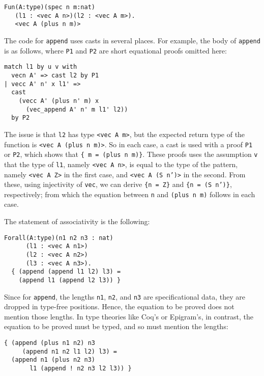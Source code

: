 \documentclass[preprint,natbib]{sigplanconf}
\begin{document}
\begin{verbatim}
Fun(A:type)(spec n m:nat)
   (l1 : <vec A n>)(l2 : <vec A m>).
   <vec A (plus n m)> 
\end{verbatim}


\noindent The code for \texttt{append} uses casts in several places.
For example, the body of \texttt{append} is as follows, where
\texttt{P1} and \texttt{P2} are short equational proofs omitted here:

\begin{verbatim}
match l1 by u v with
  vecn A' => cast l2 by P1
| vecc A' n' x l1' => 
  cast
    (vecc A' (plus n' m) x 
      (vec_append A' n' m l1' l2)) 
  by P2

\end{verbatim}
             
\noindent The issue is that \texttt{l2} has type \texttt{<vec A m>},
but the expected return type of the function is \texttt{<vec A (plus n
m)>}.  So in each case, a cast is used with a proof \texttt{P1} or
\texttt{P2}, which shows that \texttt{\{ m = (plus n m)\}}.  These
proofs uses the assumption \texttt{v} that the type of \texttt{l1},
namely \texttt{<vec A n>}, is equal to the type of the pattern, namely
\texttt{<vec A Z>} in the first case, and \texttt{<vec A (S n')>} in
the second.  From these, using injectivity of \texttt{vec}, we can
derive \texttt{\{n = Z\}} and \texttt{\{n = (S n')\}}, respectively;
from which the equation between \texttt{n} and \texttt{(plus n m)}
follows in each case.

The statement of associativity is the following:

{\begin{verbatim}
Forall(A:type)(n1 n2 n3 : nat)
      (l1 : <vec A n1>)
      (l2 : <vec A n2>)
      (l3 : <vec A n3>).
  { (append (append l1 l2) l3) =
    (append l1 (append l2 l3)) }
\end{verbatim}}

\noindent Since for \texttt{append}, the lengths
\texttt{n1}, \texttt{n2}, and \texttt{n3} are specificational data,
they are dropped in type-free positions.  Hence, the equation to be
proved does not mention those lengths.  In type theories like Coq's or
Epigram's, in contrast, the equation to be proved must be typed, and
so must mention the lengths:

{\begin{verbatim}
{ (append (plus n1 n2) n3
     (append n1 n2 l1 l2) l3) =
  (append n1 (plus n2 n3)
       l1 (append ! n2 n3 l2 l3)) }
\end{verbatim}}
\end{document}
